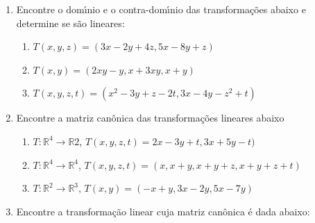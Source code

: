 \documentclass[a4paper,5pt]{amsbook}
\begin{document}
\vspace{1cm}
\begin{enumerate}
	\vspace{0.5cm}
	\item Encontre o dom\'{\i}nio e o contra-dom\'{\i}nio das transforma\c{c}\~oes abaixo e
		determine se s\~ao lineares:
		\begin{enumerate}
			\item $T(x,y,z) = (3x-2y+4z, 5x-8y+z)$
			\item $T(x,y) = (2xy-y, x+3xy, x+y)$
			\item $T(x,y,z,t) = (x^2-3y+z-2t, 3x-4y-z^2+t)$
		\end{enumerate}

	\vspace{0.5cm}
	\item Encontre a matriz can\^onica das transforma\c{c}\~oes lineares abaixo
		\begin{enumerate}
			\item $T: \mathbb{R}^4 \rightarrow \mathbb{R}2$, $T(x,y,z,t) =
				2x-3y+t, 3x+5y-t)$
			\item $T: \mathbb{R}^4 \rightarrow \mathbb{R}^4$, $T(x,y,z,t) = (x,
				x+y, x+y+z, x+y+z+t)$
			\item $T: \mathbb{R}^2 \rightarrow \mathbb{R}^3$, $T(x,y) = (-x+y,
				3x-2y, 5x-7y)$
		\end{enumerate}

	\vspace{0.5cm}
	\item Encontre a transforma\c{c}\~ao linear cuja matriz can\^onica \'e dada abaixo:



\end{enumerate}
\end{document}
